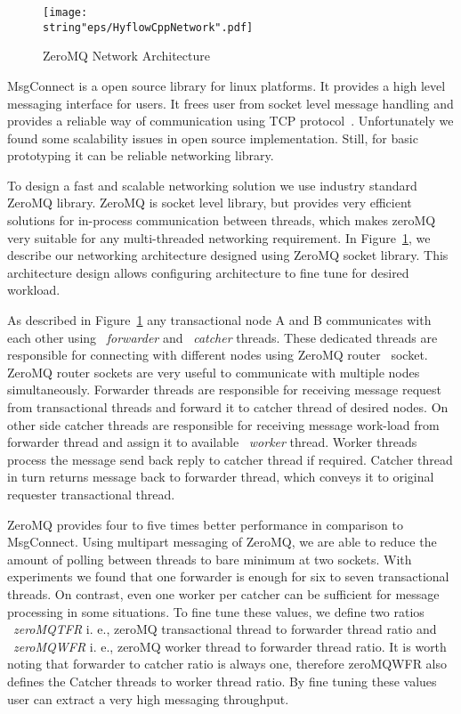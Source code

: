 \documentclass[12pt,english]{report}
\begin{document}
\begin{figure}
\begin{minipage}[b]{0.9\linewidth}\centering
\centering \texttt{[image: \\string"eps/HyflowCppNetwork".pdf]}
\caption{ZeroMQ Network Architecture}
\label{Fig:HyflowCppNetwork}
\end{minipage}
\end{figure}

MsgConnect is a open source library for linux platforms. It provides a high level messaging interface for users. It frees user from socket level message handling and provides a reliable way of communication using TCP protocol~\cite{forouzan2002tcp}. Unfortunately we found some scalability issues in open source implementation. Still, for basic prototyping it can be reliable networking library.

To design a fast and scalable networking solution we use industry standard ZeroMQ library. ZeroMQ is socket level library, but provides very efficient solutions for in-process communication between threads, which makes zeroMQ very suitable for any multi-threaded networking requirement. In Figure~\ref{Fig:HyflowCppNetwork}, we describe our networking architecture designed using ZeroMQ socket library. This architecture design allows configuring architecture to fine tune for desired workload. 

As described in Figure~\ref{Fig:HyflowCppNetwork} any transactional node A and B communicates with each other using ~\emph{forwarder} and ~\emph{catcher} threads. These dedicated threads are responsible for connecting with different nodes using ZeroMQ router~\cite{hintjens2011omq} socket. ZeroMQ router sockets are very useful to communicate with multiple nodes simultaneously. Forwarder threads are responsible for receiving message request from transactional threads and forward it to catcher thread of desired nodes. On other side catcher threads are responsible for receiving message work-load from forwarder thread and assign it to available ~\emph{worker} thread. Worker threads process the message send back reply to catcher thread if required. Catcher thread in turn returns message back to forwarder thread, which conveys it to original requester transactional thread.

ZeroMQ provides four to five times better performance in comparison to MsgConnect. Using multipart messaging of ZeroMQ, we are able to reduce the amount of polling between threads to bare minimum at two sockets. With experiments we found that one forwarder is enough for six to seven transactional threads. On contrast, even one worker per catcher can be sufficient for message processing in some situations. To fine tune these values, we define two ratios ~\emph{zeroMQTFR} i. e., zeroMQ transactional thread to forwarder thread ratio and ~\emph{zeroMQWFR} i. e., zeroMQ worker thread to forwarder thread ratio. It is worth noting that forwarder to catcher ratio is always one, therefore zeroMQWFR also defines the Catcher threads to worker thread ratio. By fine tuning these values user can extract a very high messaging throughput.
\end{document}

